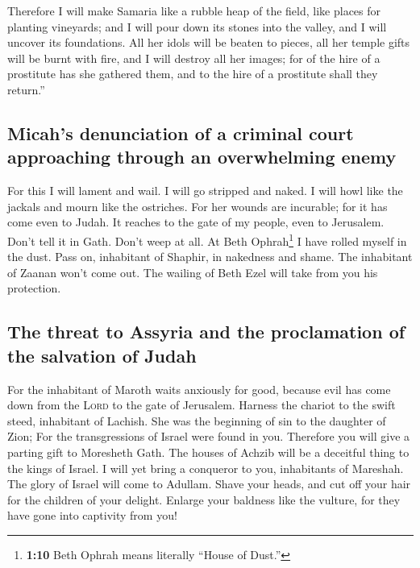  Therefore I will make Samaria like a rubble heap of the
field, like places for planting vineyards; and I will pour down its
stones into the valley, and I will uncover its foundations.
 All her idols will be beaten to pieces, all her temple
gifts will be burnt with fire, and I will destroy all her images; for of
the hire of a prostitute has she gathered them, and to the hire of a
prostitute shall they return.''

\hypertarget{micahs-denunciation-of-a-criminal-court-approaching-through-an-overwhelming-enemy}{%
\subsection{Micah's denunciation of a criminal court approaching through
an overwhelming
enemy}\label{micahs-denunciation-of-a-criminal-court-approaching-through-an-overwhelming-enemy}}

 For this I will lament and wail. I will go stripped and
naked. I will howl like the jackals and mourn like the ostriches.
 For her wounds are incurable; for it has come even to
Judah. It reaches to the gate of my people, even to Jerusalem.
 Don't tell it in Gath. Don't weep at all. At Beth
Ophrah\footnote{\textbf{1:10} Beth Ophrah means literally ``House of
  Dust.''} I have rolled myself in the dust.  Pass on,
inhabitant of Shaphir, in nakedness and shame. The inhabitant of Zaanan
won't come out. The wailing of Beth Ezel will take from you his
protection.

\hypertarget{the-threat-to-assyria-and-the-proclamation-of-the-salvation-of-judah}{%
\subsection{The threat to Assyria and the proclamation of the salvation
of
Judah}\label{the-threat-to-assyria-and-the-proclamation-of-the-salvation-of-judah}}

 For the inhabitant of Maroth waits anxiously for good,
because evil has come down from the \textsc{Lord} to the gate of
Jerusalem.  Harness the chariot to the swift steed,
inhabitant of Lachish. She was the beginning of sin to the daughter of
Zion; For the transgressions of Israel were found in you.
 Therefore you will give a parting gift to Moresheth
Gath. The houses of Achzib will be a deceitful thing to the kings of
Israel.  I will yet bring a conqueror to you, inhabitants
of Mareshah. The glory of Israel will come to Adullam. 
Shave your heads, and cut off your hair for the children of your
delight. Enlarge your baldness like the vulture, for they have gone into
captivity from you!

